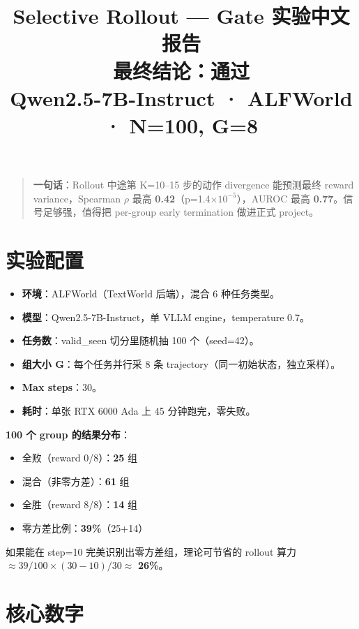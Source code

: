 \documentclass[11pt,a4paper]{article}
\title{\vspace{-1.5cm}\textbf{Selective Rollout — Gate 实验中文报告}\\[0.2em]
\large \textbf{最终结论：通过}\\[0.1em]
\small Qwen2.5-7B-Instruct · ALFWorld · N=100, G=8}
\author{}
\date{}
\begin{document}
\maketitle
\vspace{-1.5em}

\begin{quote}
\textbf{一句话}：Rollout 中途第 K=10--15 步的动作 divergence 能预测最终 reward variance，Spearman $\rho$ 最高 \textbf{0.42}（p=1.4$\times 10^{-5}$），AUROC 最高 \textbf{0.77}。信号足够强，值得把 per-group early termination 做进正式 project。
\end{quote}

\section{实验配置}

\begin{itemize}
  \item \textbf{环境}：ALFWorld（TextWorld 后端），混合 6 种任务类型。
  \item \textbf{模型}：Qwen2.5-7B-Instruct，单 VLLM engine，temperature 0.7。
  \item \textbf{任务数}：valid\_seen 切分里随机抽 100 个（seed=42）。
  \item \textbf{组大小 G}：每个任务并行采 8 条 trajectory（同一初始状态，独立采样）。
  \item \textbf{Max steps}：30。
  \item \textbf{耗时}：单张 RTX 6000 Ada 上 45 分钟跑完，零失败。
\end{itemize}

\textbf{100 个 group 的结果分布}：

\begin{itemize}
  \item 全败（reward 0/8）：\textbf{25} 组
  \item 混合（非零方差）：\textbf{61} 组
  \item 全胜（reward 8/8）：\textbf{14} 组
  \item 零方差比例：\textbf{39\%}（25+14）
\end{itemize}

如果能在 step=10 完美识别出零方差组，理论可节省的 rollout 算力
$\approx 39/100 \times (30-10)/30 \approx$ \textbf{26\%}。

\section{核心数字}
\end{document}
